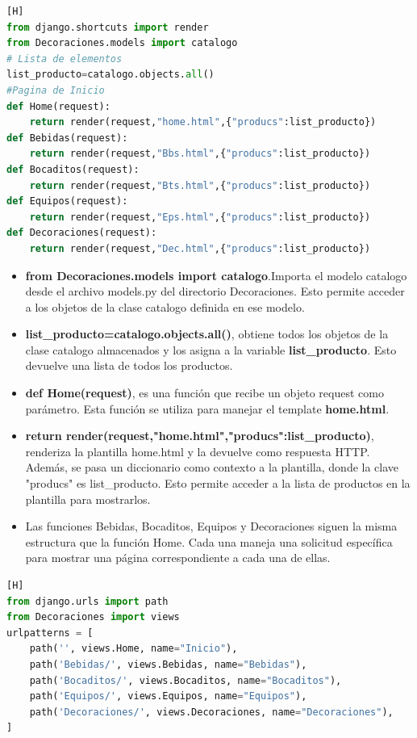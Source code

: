 \documentclass{article}
\begin{document}
    \begin{lstlisting}[language=python,caption={Decoraciones/views.py}][H]
from django.shortcuts import render
from Decoraciones.models import catalogo
# Lista de elementos
list_producto=catalogo.objects.all()
#Pagina de Inicio
def Home(request):
    return render(request,"home.html",{"producs":list_producto})
def Bebidas(request):
    return render(request,"Bbs.html",{"producs":list_producto})
def Bocaditos(request):
    return render(request,"Bts.html",{"producs":list_producto})
def Equipos(request):
    return render(request,"Eps.html",{"producs":list_producto})
def Decoraciones(request):
    return render(request,"Dec.html",{"producs":list_producto})
    \end{lstlisting}
	\begin{itemize}
	    \item \textbf{from Decoraciones.models import catalogo}.Importa el modelo catalogo desde el archivo models.py del directorio Decoraciones. Esto permite acceder a los objetos de la clase catalogo definida en ese modelo.
        \item \textbf{list_producto=catalogo.objects.all()}, obtiene todos los objetos de la clase catalogo almacenados y los asigna a la variable \textbf{list_producto}. Esto devuelve una lista de todos los productos.
        \item \textbf{def Home(request)}, es una función que recibe un objeto request como parámetro. Esta función se utiliza para manejar el template \textbf{home.html}.
        \item \textbf{return render(request,"home.html",{"producs":list_producto})}, renderiza la plantilla home.html y la devuelve como respuesta HTTP. Además, se pasa un diccionario como contexto a la plantilla, donde la clave "producs" es list_producto. Esto permite acceder a la lista de productos en la plantilla para mostrarlos.
        \item Las funciones Bebidas, Bocaditos, Equipos y Decoraciones siguen la misma estructura que la función Home. Cada una maneja una solicitud específica para mostrar una página correspondiente a cada una de ellas.
    \end{itemize}
	\begin{lstlisting}[language=python,caption={Decoraciones/urls.py}][H]
from django.urls import path
from Decoraciones import views
urlpatterns = [
    path('', views.Home, name="Inicio"),
    path('Bebidas/', views.Bebidas, name="Bebidas"),
    path('Bocaditos/', views.Bocaditos, name="Bocaditos"),
    path('Equipos/', views.Equipos, name="Equipos"),
    path('Decoraciones/', views.Decoraciones, name="Decoraciones"),
]
    \end{lstlisting}
\end{document}

